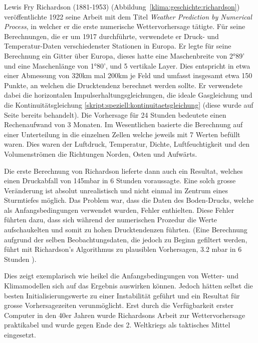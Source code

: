 \begin{refsection}
Lewis Fry Richardson (1881-1953) (Abbildung~\ref{klima:geschichte:richardson}) veröffentlichte 1922 seine Arbeit mit dem Titel {\em Weather Prediction by Numerical Process}, in welcher er die erste numerische Wettervorhersage tätigte. Für seine Berechnungen, die er um 1917 durchführte, verwendete er Druck- und Temperatur-Daten verschiedenster Stationen in Europa. Er legte für seine Berechnung ein Gitter über Europa, dieses hatte eine Maschenbreite von 2°89' und eine Maschenlänge von 1°80', und 5 vertikale Layer. Dies entspricht in etwa einer Abmessung von 320km mal 200km je Feld und umfasst insgesamt etwa 150 Punkte, an welchen die Drucktendenz berechnet werden sollte. Er verwendete dabei die horizontalen Impulserhaltungsgleichungen, die ideale Gasgleichung und die Kontinuitätsgleichung \eqref{skript:speziell:kontinuitaetsgleichung} (diese wurde auf Seite \pageref{skript:speziell:kontinuitaetsgleichung} bereits behandelt). Die Vorhersage für 24 Stunden bedeutete einen Rechenaufwand von 3 Monaten. Im Wesentlichen basierte die Berechnung auf einer Unterteilung in die einzelnen Zellen welche jeweils mit 7 Werten befüllt waren. Dies waren der Luftdruck, Temperatur, Dichte, Luftfeuchtigkeit und den Volumenströmen die Richtungen Norden, Osten und Aufwärts.

Die erste Berechnung von Richardson lieferte dann auch ein Resultat, welches einen Druckabfall von 145mbar in 6 Stunden voraussagte. Eine solch grosse Veränderung ist absolut unrealistisch und nicht einmal im Zentrum eines Sturmtiefes möglich. Das Problem war, dass die Daten des Boden-Drucks, welche als Anfangsbedingungen verwendet wurden, Fehler enthielten. Diese Fehler führten dazu, dass sich während der numerischen Prozedur die Werte aufschaukelten und somit zu hohen Drucktendenzen führten. (Eine Berechnung aufgrund der selben Beobachtungsdaten, die jedoch zu Beginn gefiltert werden, führt mit Richardson's Algorithmus zu plausiblen Vorhersagen, 3.2 mbar in 6 Stunden \cite{klima:stocker}).

Dies zeigt exemplarisch wie heikel die Anfangsbedingungen von Wetter- und Klimamodellen sich auf das Ergebnis auswirken können. Jedoch hätten selbst die besten Initialisierungswerte zu einer Instabilität geführt und ein Resultat für grosse Vorhersagezeiten verunmöglicht. Erst durch die Verfügbarkeit erster Computer in den 40er Jahren wurde Richardsons Arbeit zur  Wettervorhersage praktikabel und wurde gegen Ende des 2. Weltkriegs als taktisches Mittel eingesetzt.


\end{refsection}
